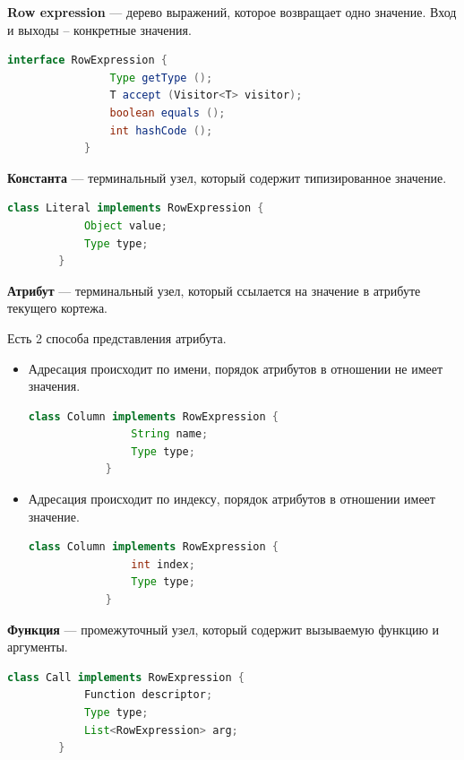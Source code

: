 \documentclass[11pt]{article}
\begin{document}
    \textbf{Row expression} --- дерево выражений, которое возвращает одно значение.
    Вход и выходы -- конкретные значения.

    \begin{lstlisting}[language=Java,
        caption={Интерфейс Row expression}]
            interface RowExpression {
                Type getType ();
                T accept (Visitor<T> visitor);
                boolean equals ();
                int hashCode ();
            }
    \end{lstlisting}

    \textbf{Константа} --- терминальный узел, который содержит типизированное значение.

    \begin{lstlisting}[language=Java,
        caption={Класс константы}]
        class Literal implements RowExpression {
            Object value;
            Type type;
        }
    \end{lstlisting}

    \textbf{Атрибут} --- терминальный узел, который ссылается на значение в атрибуте текущего кортежа.

    Есть 2 способа представления атрибута.

    \begin{itemize}
        \item Адресация происходит по имени, порядок атрибутов в отношении не имеет значения.
        \begin{lstlisting}[language=Java,
            caption={Пример адресации по имени}]
            class Column implements RowExpression {
                String name;
                Type type;
            }
        \end{lstlisting}
        \item Адресация происходит по индексу, порядок атрибутов в отношении имеет значение.
        \begin{lstlisting}[language=Java,
            caption={Пример адресации по индексу}]
            class Column implements RowExpression {
                int index;
                Type type;
            }
        \end{lstlisting}
    \end{itemize}

    \textbf{Функция} --- промежуточный узел, который содержит вызываемую функцию и аргументы.

    \begin{lstlisting}[language=Java,
        caption={Функция}]
        class Call implements RowExpression {
            Function descriptor;
            Type type;
            List<RowExpression> arg;
        }
    \end{lstlisting}
\end{document}
